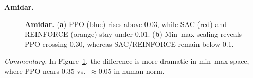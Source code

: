 \noindent \textbf{Amidar.}
\begin{figure} 
	\centering
	\quad
	\caption{\textbf{Amidar.}
		(\textbf{a}) PPO (blue) rises above 0.03, while SAC (red) and REINFORCE (orange) stay under 0.01. 
		(\textbf{b}) Min--max scaling reveals PPO crossing 0.30, whereas SAC/REINFORCE remain below 0.1.}
	\label{fig:amidar_combined}
\end{figure}

\noindent
\emph{Commentary.} In Figure~\ref{fig:amidar_combined}, the difference is more dramatic in min--max space, where PPO nears 0.35 vs.\ \(\approx0.05\) in human norm.

\medskip

